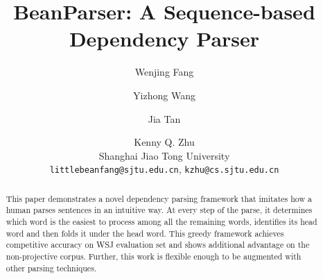 \documentclass[11pt]{article}
\title{BeanParser: A Sequence-based Dependency Parser}
\author{Wenjing Fang \and Yizhong Wang \and Jia Tan \and Kenny Q. Zhu  \\
  Shanghai Jiao Tong University \\
  {\tt littlebeanfang@sjtu.edu.cn}, {\tt kzhu@cs.sjtu.edu.cn} \\
  }
\newcommand{\BF}[1]{\textcolor{red}{Bean: #1}}
\begin{document}
\maketitle
\begin{abstract}
This paper demonstrates a novel dependency parsing framework that
imitates how a human parses sentences in an intuitive way.
At every step of the parse, it determines which word is the easiest to
process among all the remaining words, identifies its head word and then
folds it under the head word.
This greedy framework achieves competitive accuracy on WSJ evaluation set
and shows additional advantage on the non-projective corpus.
Further, this work is flexible enough to be augmented with other
parsing techniques.
\end{abstract}















\end{document}
